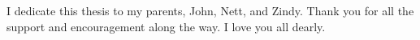 
I dedicate this thesis to my parents, John, Nett, and Zindy. Thank you for all the support and encouragement along the way. I love you all dearly.
